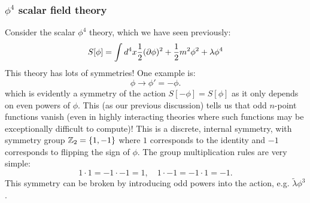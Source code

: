 \subsubsection*{$\phi^4$ scalar field theory}
Consider the scalar $\phi^4$ theory, which we have seen previously:
\begin{equation}
    S[\phi] = \int d^4x \frac{1}{2}(\partial\phi)^2 + \frac{1}{2}m^2\phi^2 + \lambda \phi^4
\end{equation}
This theory has lots of symmetries! One example is:
\begin{equation}
    \phi \to \phi' = -\phi.
\end{equation}
which is evidently a symmetry of the action $S[-\phi] = S[\phi]$ as it only depends on even powers of $\phi$. This (as our previous discussion) tells us that odd $n$-point functions vanish (even in highly interacting theories where such functions may be exceptionally difficult to compute)! This is a discrete, internal symmetry, with symmetry group $\mathbb{Z}_2 = \set{1, -1}$ where $1$ corresponds to the identity and $-1$ corresponds to flipping the sign of $\phi$. The group multiplication rules are very simple:
\begin{equation}
    1 \cdot 1 = -1 \cdot -1 = 1, \quad 1 \cdot -1 = -1 \cdot 1 = -1.
\end{equation}
This symmetry can be broken by introducing odd powers into the action, e.g. $\tilde{\lambda}\phi^3$.

